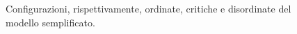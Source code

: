 \documentclass[Lau, noexaminfo, oneside]{sapthesis} %
\begin{document}
\begin{figure}[H]
\hspace{10pt}
\hspace{10pt}
\centering
\caption{Configurazioni, rispettivamente, ordinate, critiche e disordinate del modello semplificato.}
\end{figure}
\end{document}
